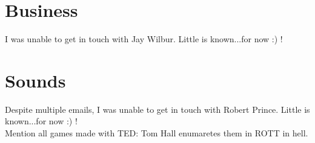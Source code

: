 \documentclass[book.tex]{subfiles}
\begin{document}
\section{Business}
I was unable to get in touch with Jay Wilbur. Little is known...for now :) !\\
\section{Sounds}
Despite multiple emails, I was unable to get in touch with Robert Prince. Little is known...for now :) !\\
Mention all games made with TED: Tom Hall enumaretes them in ROTT in hell.
\end{document}
